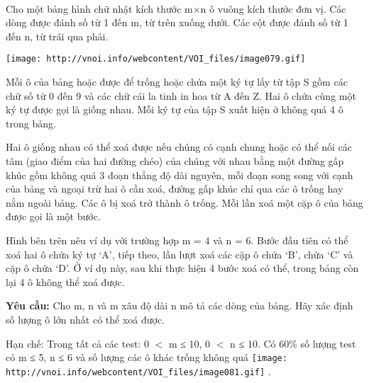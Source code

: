  

Cho một bảng hình chữ nhật kích thước m×n ô vuông kích thước đơn vị. Các dòng được đánh số từ 1 đến m, từ trên xuống dưới. Các cột được đánh số từ 1 đến n, từ trái qua phải.


\texttt{[image: http://vnoi.info/webcontent/VOI\_files/image079.gif]}

Mỗi ô của bảng hoặc được để trống hoặc chứa một ký tự lấy từ tập S gồm các chữ số từ 0 đến 9 và các chữ cái la tinh in hoa từ A đến Z. Hai ô chứa cùng một ký tự được gọi là giống nhau. Mỗi ký tự của tập S xuất hiện ở không quá 4 ô trong bảng.

Hai ô giống nhau có thể xoá được nếu chúng có cạnh chung hoặc có thể nối các tâm (giao điểm của hai đường chéo) của chúng với nhau bằng một đường gấp khúc gồm không quá 3 đoạn thẳng độ dài nguyên, mỗi đoạn song song với cạnh của bảng và ngoại trừ hai ô cần xoá, đường gấp khúc chỉ qua các ô trống hay nằm ngoài bảng. Các ô bị xoá trở thành ô trống. Mỗi lần xoá một cặp ô của bảng được gọi là một bước.

Hình bên trên nêu ví dụ với trường hợp m = 4 và n = 6. Bước đầu tiên có thể xoá hai ô chứa ký tự ‘A’, tiếp theo, lần lượt xoá các cặp ô chứa ‘B’, chứa ‘C’ và cặp ô chứa ‘D’. Ở ví dụ này, sau khi thực hiện 4 bước xoá có thể, trong bảng còn lại 4 ô không thể xoá được.

\textbf{Yêu cầu: } Cho m, n và m xâu độ dài n mô tả các dòng của bảng. Hãy xác định số lượng ô lớn nhất có thể xoá được.

Hạn chế:
Trong tất cả các test: 0 $<$ m ≤ 10, 0 $<$ n ≤ 10. Có 60\% số lượng test có m ≤ 5, n ≤ 6 và số lượng các ô khác trống không quá 
\texttt{[image: http://vnoi.info/webcontent/VOI\_files/image081.gif]} .
